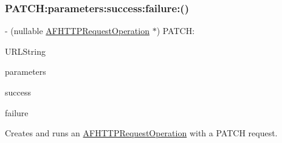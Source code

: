 \subsubsection{\texorpdfstring{P\+A\+T\+C\+H\+:parameters\+:success\+:failure\+:()}{PATCH:parameters:success:failure:()}\hspace{0.1cm}{\footnotesize\ttfamily [3/3]}}
{\footnotesize\ttfamily -\/ (nullable \mbox{\hyperlink{interface_a_f_h_t_t_p_request_operation}{A\+F\+H\+T\+T\+P\+Request\+Operation}} $\ast$) P\+A\+T\+C\+H\+: \begin{DoxyParamCaption}\item[{(N\+S\+String $\ast$)}]{U\+R\+L\+String }\item[{parameters:(nullable id)}]{parameters }\item[{success:(nullable void($^\wedge$)(\mbox{\hyperlink{interface_a_f_h_t_t_p_request_operation}{A\+F\+H\+T\+T\+P\+Request\+Operation}} $\ast$operation, id response\+Object))}]{success }\item[{failure:(nullable void($^\wedge$)(\mbox{\hyperlink{interface_a_f_h_t_t_p_request_operation}{A\+F\+H\+T\+T\+P\+Request\+Operation}} $\ast$\+\_\+\+\_\+nullable operation, N\+S\+Error $\ast$error))}]{failure }\end{DoxyParamCaption}}

Creates and runs an {\ttfamily \mbox{\hyperlink{interface_a_f_h_t_t_p_request_operation}{A\+F\+H\+T\+T\+P\+Request\+Operation}}} with a {\ttfamily P\+A\+T\+CH} request.


